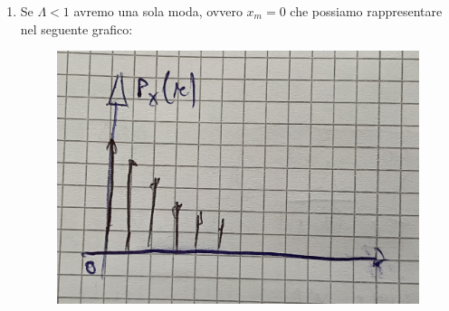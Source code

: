 \documentclass{article}
\begin{document}
\begin{enumerate}
\begin{figure}[ht]
    \end{figure} 
    \item Se $\Lambda < 1$ avremo una sola moda, ovvero $x_m = 0$ che possiamo rappresentare nel seguente grafico:
    \begin{figure}[H]
    \centering
    \includegraphics[scale=0.10]{images/68.PoissDeltaMin.jpeg}
    \end{figure} 
\end{enumerate} 
\end{document}
